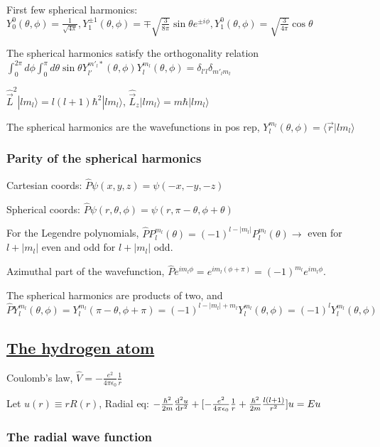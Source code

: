 First few spherical harmonics: $Y_0^0(\theta, \phi) = \frac{1}{\sqrt{4\pi}}, Y_1^{\pm 1}(\theta, \phi) = \mp \sqrt{\frac{3}{8 \pi}} \sin \theta e^{\pm i \phi}, Y_1^0(\theta, \phi) = \sqrt{\frac{3}{4\pi}} \cos \theta$

The spherical harmonics satisfy the orthogonality relation $\int_0^{2 \pi} d\phi \int_0^{\pi} d\theta \sin \theta Y_{l'}^{m'_l *} (\theta, \phi) Y_l^{m_l} (\theta, \phi) = \delta_{l'l} \delta_{m'_l m_l}$

$\widehat{\vec{L}}^2 | l m_l \rangle = l(l+1) \hbar^2 |l m_l \rangle$, $\widehat{\vec{L}}_z | l m_l \rangle = m \hbar |l m_l \rangle$

The spherical harmonics are the wavefunctions in pos rep, $Y_l^{m_l}(\theta, \phi) = \langle \vec{r} | l m_l \rangle$

\subsubsection{Parity of the spherical harmonics}
Cartesian coords: $\widehat{P} \psi(x, y, z) = \psi(-x, -y, -z)$

Spherical coords: $\widehat{P} \psi(r, \theta, \phi) = \psi(r, \pi - \theta, \phi + \theta)$

For the Legendre polynomials, $\widehat{P} P_l^{m_l} (\theta) = (-1)^{l - |m_l|} P_l^{m_l} (\theta) \rightarrow$ even for $l + |m_l|$ even and odd for $l + |m_l|$ odd.

Azimuthal part of the wavefunction, $\widehat{P} e^{im_l \phi} = e^{i m_l (\phi + \pi)} = (-1)^{m_l} e^{i m_l \phi}$.

The spherical harmonics are products of two, and 
$$\widehat{P} Y_l^{m_l} (\theta, \phi) = Y_l^{m_l} (\pi - \theta, \phi + \pi) = (-1)^{l - |m_l| + m_l} Y_l^{m_l}(\theta, \phi) = (-1)^{l} Y_l^{m_l} (\theta, \phi)$$

\subsection{\underline{The hydrogen atom}}
Coulomb's law, $\widehat{V} = - \frac{e^2}{4 \pi \epsilon_0} \frac{1}{r}$

Let $u(r) \equiv r R(r)$, Radial eq: $-\frac{\hbar^2}{2m} \dv[2]{u}{r} + [-\frac{e^2}{4 \pi \epsilon_0} \frac{1}{r} + \frac{\hbar^2}{2m} \frac{l (l+1)}{r^2}]u = Eu$

\subsubsection{The radial wave function}

